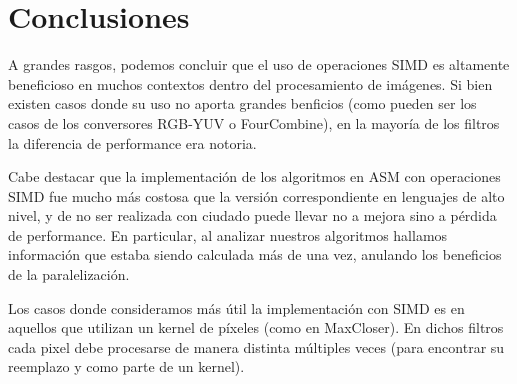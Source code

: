 \section{Conclusiones}
	A grandes rasgos, podemos concluir que el uso de operaciones SIMD es altamente beneficioso en muchos contextos dentro del procesamiento de imágenes. Si bien existen casos donde su uso no aporta grandes benficios (como pueden ser los casos de los conversores RGB-YUV o FourCombine), en la mayoría de los filtros la diferencia de performance era notoria.

	Cabe destacar que la implementación de los algoritmos en ASM con operaciones SIMD fue mucho más costosa que la versión correspondiente en lenguajes de alto nivel, y de no ser realizada con ciudado puede llevar no a mejora sino a pérdida de performance. En particular, al analizar nuestros algoritmos hallamos información que estaba siendo calculada más de una vez, anulando los beneficios de la paralelización.

	Los casos donde consideramos más útil la implementación con SIMD es en aquellos que utilizan un kernel de píxeles (como en MaxCloser). En dichos filtros cada pixel debe procesarse de manera distinta múltiples veces (para encontrar su reemplazo y como parte de un kernel).
